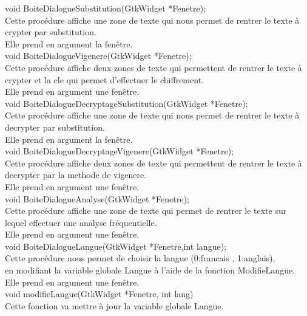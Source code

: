 \documentclass[a4]{article}
\begin{document}
	void BoiteDialogueSubstitution(GtkWidget *Fenetre);\\
		Cette procédure affiche une zone de texte qui nous permet de rentrer le texte à crypter par substitution.\\
		Elle prend en argument la fenêtre.\\
	
	void BoiteDialogueVigenere(GtkWidget *Fenetre);\\
		Cette procédure affiche deux zones de texte qui permettent de rentrer le texte à crypter et la cle qui permet d'effectuer le chiffrement.\\
		Elle prend en argument une fenêtre.\\
		
	void BoiteDialogueDecryptageSubstitution(GtkWidget *Fenetre);\\
		Cette procédure affiche une zone de texte qui nous permet de rentrer le texte à decrypter par substitution.\\
		Elle prend en argument la fenêtre.\\
	
	void BoiteDialogueDecryptageVigenere(GtkWidget *Fenetre);\\
		Cette procédure affiche deux zones de texte qui permettent de rentrer le texte à decrypter par la methode de vigenere.\\
		Elle prend en argument une fenêtre.\\
		
	void BoiteDialogueAnalyse(GtkWidget *Fenetre);\\
		Cette procédure affiche une zone de texte qui permet de rentrer le texte sur lequel effectuer une analyse fréquentielle.\\
		Elle prend en argument une fenêtre.\\
		
	void BoiteDialogueLangue(GtkWidget *Fenetre,int langue);\\
		Cette procédure nous permet de choisir la langue (0:francais , 1:anglais),\\
		en modifiant la variable globale Langue à l'aide de la fonction ModifieLangue.\\
		Elle prend en argument une fenêtre.\\
		
	void modifieLangue(GtkWidget *Fenetre, int lang)\\
		Cette fonction va mettre à jour la variable globale Langue.\\
		
\end{document}

